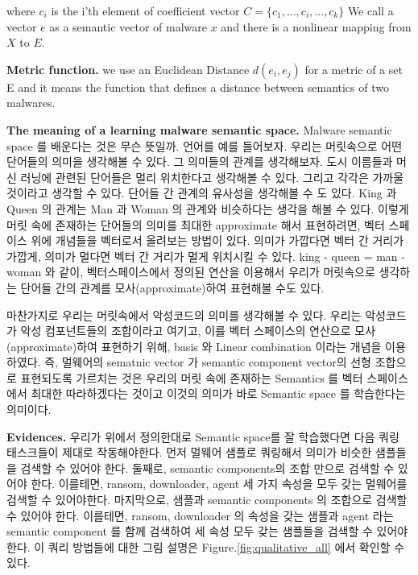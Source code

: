 where $c_i$ is the i’th element of coefficient vector $ C = \{c_1, …, c_i, …, c_k\}$
We call a vector $e$ as a semantic vector of malware $x$ and there is a nonlinear mapping from $X$ to $E$. 

\textbf{Metric function. }
we use an Euclidean Distance $d(e_i, e_j)$ for a metric of a set E and it means the function that defines a distance between  semantics of two malwares. 

\textbf{The meaning of a learning malware semantic space. }
Malware semantic space 를 배운다는 것은 무슨 뜻일까.
언어를 예를 들어보자. 우리는 머릿속으로 어떤 단어들의 의미을 생각해볼 수 있다. 그 의미들의 관계를 생각해보자. 도시 이름들과 머신 러닝에 관련된 단어들은 멀리 위치한다고 생각해볼 수 있다. 그리고 각각은 가까울 것이라고 생각할 수 있다. 단어들 간 관계의 유사성을 생각해볼 수 도 있다. King 과 Queen 의 관계는 Man 과 Woman 의 관계와 비슷하다는 생각을 해볼 수 있다. 이렇게 머릿 속에 존재하는 단어들의 의미를 최대한 approximate 해서 표현하려면, 벡터 스페이스 위에 개념들을 벡터로서 올려보는 방법이 있다. 의미가 가깝다면 벡터 간 거리가 가깝게,  의미가 멀다면 벡터 간 거리가 멀게 위치시킬 수 있다. king - queen = man - woman 와 같이, 벡터스페이스에서 정의된 연산을 이용해서 우리가 머릿속으로 생각하는 단어들 간의 관계를 모사(approximate)하여 표현해볼 수도 있다. 

마찬가지로 우리는 머릿속에서 악성코드의 의미를 생각해볼 수 있다. 우리는 악성코드가 악성 컴포넌트들의 조합이라고 여기고, 이를 벡터 스페이스의 연산으로 모사(approximate)하여 표현하기 위해, basis 와 Linear combination 이라는 개념을 이용하였다. 즉, 멀웨어의 sematnic vector 가 semantic component vector의 선형 조합으로 표현되도록 가르치는 것은 우리의 머릿 속에 존재하는 Semantics 를 벡터 스페이스에서 최대한 따라하겠다는 것이고 이것의 의미가 바로 Semantic space 를 학습한다는 의미이다. 

\textbf{Evidences. } 우리가 위에서 정의한대로 Semantic space를 잘 학습했다면 다음 쿼링 태스크들이 제대로 작동해야한다. 먼저 멀웨어 샘플로 쿼링해서 의미가 비슷한 샘플들을 검색할 수 있어야 한다. 둘째로, semantic components의 조합 만으로 검색할 수 있어야 한다. 이를테면, ransom, downloader, agent 세 가지 속성을 모두 갖는 멀웨어를 검색할 수 있어야한다. 마지막으로, 샘플과 semantic components 의 조합으로 검색할 수 있어야 한다. 이를테면, ransom, downloader 의 속성을 갖는 샘플과 agent 라는 semantic component 를 함께 검색하여 세 속성 모두 갖는 샘플들을 검색할 수 있어야 한다. 이 쿼리 방법들에 대한 그림 설명은 Figure.\ref{fig:qualitative_all} 에서 확인할 수 있다. 

